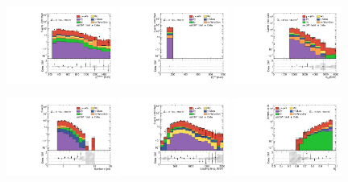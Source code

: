 \begin{figure}[ht!]
 \begin{center}

   \includegraphics[width=0.32\textwidth]{images_tmp/results/fr2/can_VRM1H_ph_pt0_afterFit.pdf}
   \includegraphics[width=0.32\textwidth]{images_tmp/results/fr2/can_VRM1H_met_et_afterFit.pdf}
   \includegraphics[width=0.32\textwidth]{images_tmp/results/fr2/can_VRM1H_meff_afterFit.pdf}

   \includegraphics[width=0.32\textwidth]{images_tmp/results/fr2/can_VRM1H_jet_n_afterFit}
   \includegraphics[width=0.32\textwidth]{images_tmp/results/fr2/can_VRM1H_jet_pt0_afterFit.pdf}
   \includegraphics[width=0.32\textwidth]{images_tmp/results/fr2/can_VRM1H_rt4_afterFit}


\end{center}
\end{figure}
